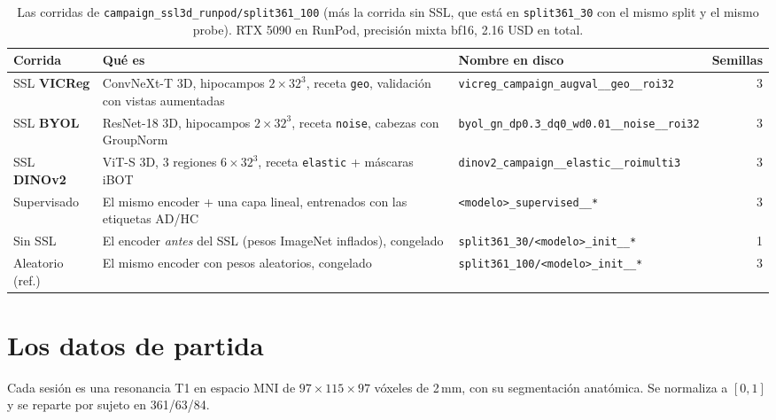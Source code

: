 \documentclass[11pt,a4paper]{article}
\begin{document}
\begin{table}[H]
\centering
\small
\begin{tabularx}{\textwidth}{l>{\raggedright\arraybackslash}X>{\raggedright\arraybackslash}p{4.2cm}r}
\toprule
Corrida & Qué es & Nombre en disco & Semillas \\
\midrule
SSL \textcolor{vicregc}{\textbf{VICReg}} & ConvNeXt-T 3D, hipocampos $2\times32^3$, receta \texttt{geo}, validación con vistas aumentadas & \nolinkurl{vicreg_campaign_augval__geo__roi32} & 3 \\
SSL \textcolor{byolc}{\textbf{BYOL}} & ResNet-18 3D, hipocampos $2\times32^3$, receta \texttt{noise}, cabezas con GroupNorm & \nolinkurl{byol_gn_dp0.3_dq0_wd0.01__noise__roi32} & 3 \\
SSL \textcolor{dinoc}{\textbf{DINOv2}} & ViT-S 3D, 3 regiones $6\times32^3$, receta \texttt{elastic} + máscaras iBOT & \nolinkurl{dinov2_campaign__elastic__roimulti3} & 3 \\
\midrule
Supervisado & El mismo encoder + una capa lineal, entrenados con las etiquetas AD/HC & \nolinkurl{<modelo>_supervised__*} & 3 \\
Sin SSL & El encoder \emph{antes} del SSL (pesos ImageNet inflados), congelado & \nolinkurl{split361_30/<modelo>_init__*} & 1 \\
Aleatorio (ref.) & El mismo encoder con pesos aleatorios, congelado & \nolinkurl{split361_100/<modelo>_init__*} & 3 \\
\bottomrule
\end{tabularx}
\caption{Las corridas de \nolinkurl{campaign_ssl3d_runpod/split361_100} (más la corrida sin SSL, que
está en \texttt{split361\_30} con el mismo split y el mismo probe). RTX 5090 en RunPod, precisión
mixta bf16, 2.16 USD en total.}
\label{tab:runs}
\end{table}

\section{Los datos de partida}
\label{sec:data}

\begin{tldrbox}
Cada sesión es una resonancia T1 en espacio MNI de $97\times115\times97$ vóxeles de 2\,mm, con su
segmentación anatómica. Se normaliza a $[0,1]$ y se reparte por sujeto en 361/63/84.
\end{tldrbox}
\end{document}
